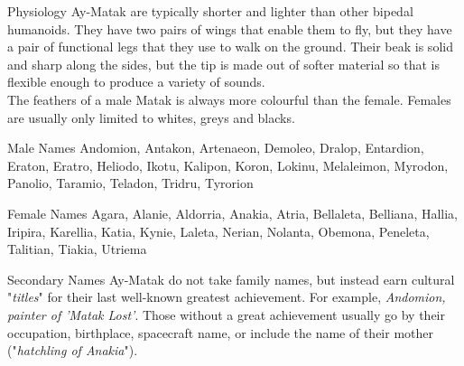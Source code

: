 \begin{genericsection}{Physiology}
Ay-Matak are typically shorter and lighter than other bipedal humanoids. They have two pairs of wings that enable them to fly, but they have a pair of functional legs that they use to walk on the ground. Their beak is solid and sharp along the sides, but the tip is made out of softer material so that is flexible enough to produce a variety of sounds.\\

The feathers of a male Matak is always more colourful than the female. Females are usually only limited to whites, greys and blacks.
\end{genericsection}

\begin{genericsection}{Male Names}
Andomion, Antakon, Artenaeon, Demoleo, Dralop, Entardion, Eraton, Eratro, Heliodo, Ikotu, Kalipon, Koron, Lokinu, Melaleimon, Myrodon, Panolio, Taramio, Teladon, Tridru, Tyrorion
\end{genericsection}

\begin{genericsection}{Female Names}
Agara, Alanie, Aldorria, Anakia, Atria, Bellaleta, Belliana, Hallia, Iripira, Karellia, Katia, Kynie, Laleta, Nerian, Nolanta, Obemona, Peneleta, Talitian, Tiakia, Utriema
\end{genericsection}

\begin{genericsection}{Secondary Names}
Ay-Matak do not take family names, but instead earn cultural "\textit{titles}" for their last well-known greatest achievement. For example, \textit{Andomion, painter of 'Matak Lost'}. Those without a great achievement usually go by their occupation, birthplace, spacecraft name, or include the name of their mother ("\textit{hatchling of Anakia}").
\end{genericsection}
